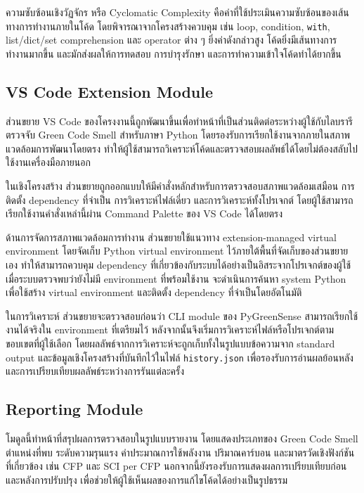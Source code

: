 ความซับซ้อนเชิงวัฏจักร หรือ {\italicfont Cyclomatic Complexity} คือค่าที่ใช้ประเมินความซับซ้อนของเส้นทางการทำงานภายในโค้ด โดยพิจารณาจากโครงสร้างควบคุม เช่น loop, condition, \texttt{with}, list/dict/set comprehension และ operator ต่าง ๆ ยิ่งค่าดังกล่าวสูง โค้ดยิ่งมีเส้นทางการทำงานมากขึ้น และมักส่งผลให้การทดสอบ การบำรุงรักษา และการทำความเข้าใจโค้ดทำได้ยากขึ้น \cite{guru99CyclomaticComplexity,radonCyclomaticComplexity}

\subsection{VS Code Extension Module}
ส่วนขยาย VS Code ของโครงงานนี้ถูกพัฒนาขึ้นเพื่อทำหน้าที่เป็นส่วนติดต่อระหว่างผู้ใช้กับไลบรารีตรวจจับ Green Code Smell สำหรับภาษา Python โดยรองรับการเรียกใช้งานจากภายในสภาพแวดล้อมการพัฒนาโดยตรง ทำให้ผู้ใช้สามารถวิเคราะห์โค้ดและตรวจสอบผลลัพธ์ได้โดยไม่ต้องสลับไปใช้งานเครื่องมือภายนอก

ในเชิงโครงสร้าง ส่วนขยายถูกออกแบบให้มีคำสั่งหลักสำหรับการตรวจสอบสภาพแวดล้อมเสมือน การติดตั้ง dependency ที่จำเป็น การวิเคราะห์ไฟล์เดี่ยว และการวิเคราะห์ทั้งโปรเจกต์ โดยผู้ใช้สามารถเรียกใช้งานคำสั่งเหล่านี้ผ่าน Command Palette ของ VS Code ได้โดยตรง

ด้านการจัดการสภาพแวดล้อมการทำงาน ส่วนขยายใช้แนวทาง {\italicfont extension-managed virtual environment} โดยจัดเก็บ Python virtual environment ไว้ภายใต้พื้นที่จัดเก็บของส่วนขยายเอง ทำให้สามารถควบคุม dependency ที่เกี่ยวข้องกับระบบได้อย่างเป็นอิสระจากโปรเจกต์ของผู้ใช้ เมื่อระบบตรวจพบว่ายังไม่มี environment ที่พร้อมใช้งาน จะดำเนินการค้นหา system Python เพื่อใช้สร้าง virtual environment และติดตั้ง dependency ที่จำเป็นโดยอัตโนมัติ

ในการวิเคราะห์ ส่วนขยายจะตรวจสอบก่อนว่า CLI module ของ PyGreenSense สามารถเรียกใช้งานได้จริงใน environment ที่เตรียมไว้ หลังจากนั้นจึงเริ่มการวิเคราะห์ไฟล์หรือโปรเจกต์ตามขอบเขตที่ผู้ใช้เลือก โดยผลลัพธ์จากการวิเคราะห์จะถูกเก็บทั้งในรูปแบบข้อความจาก standard output และข้อมูลเชิงโครงสร้างที่บันทึกไว้ในไฟล์ \texttt{history.json} เพื่อรองรับการอ่านผลย้อนหลังและการเปรียบเทียบผลลัพธ์ระหว่างการรันแต่ละครั้ง

\subsection{Reporting Module}
โมดูลนี้ทำหน้าที่สรุปผลการตรวจสอบในรูปแบบรายงาน โดยแสดงประเภทของ Green Code Smell ตำแหน่งที่พบ ระดับความรุนแรง ค่าประมาณการใช้พลังงาน ปริมาณคาร์บอน และมาตรวัดเชิงฟังก์ชันที่เกี่ยวข้อง เช่น CFP และ SCI per CFP นอกจากนี้ยังรองรับการแสดงผลการเปรียบเทียบก่อนและหลังการปรับปรุง เพื่อช่วยให้ผู้ใช้เห็นผลของการแก้ไขโค้ดได้อย่างเป็นรูปธรรม

